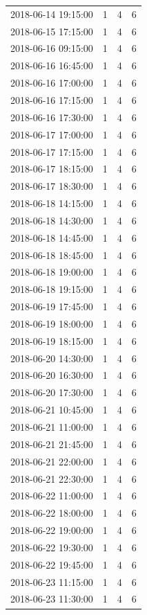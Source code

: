 \begin{tabular}{lrrr}
2018-06-14 19:15:00 & 1 & 4 & 6 \\
2018-06-15 17:15:00 & 1 & 4 & 6 \\
2018-06-16 09:15:00 & 1 & 4 & 6 \\
2018-06-16 16:45:00 & 1 & 4 & 6 \\
2018-06-16 17:00:00 & 1 & 4 & 6 \\
2018-06-16 17:15:00 & 1 & 4 & 6 \\
2018-06-16 17:30:00 & 1 & 4 & 6 \\
2018-06-17 17:00:00 & 1 & 4 & 6 \\
2018-06-17 17:15:00 & 1 & 4 & 6 \\
2018-06-17 18:15:00 & 1 & 4 & 6 \\
2018-06-17 18:30:00 & 1 & 4 & 6 \\
2018-06-18 14:15:00 & 1 & 4 & 6 \\
2018-06-18 14:30:00 & 1 & 4 & 6 \\
2018-06-18 14:45:00 & 1 & 4 & 6 \\
2018-06-18 18:45:00 & 1 & 4 & 6 \\
2018-06-18 19:00:00 & 1 & 4 & 6 \\
2018-06-18 19:15:00 & 1 & 4 & 6 \\
2018-06-19 17:45:00 & 1 & 4 & 6 \\
2018-06-19 18:00:00 & 1 & 4 & 6 \\
2018-06-19 18:15:00 & 1 & 4 & 6 \\
2018-06-20 14:30:00 & 1 & 4 & 6 \\
2018-06-20 16:30:00 & 1 & 4 & 6 \\
2018-06-20 17:30:00 & 1 & 4 & 6 \\
2018-06-21 10:45:00 & 1 & 4 & 6 \\
2018-06-21 11:00:00 & 1 & 4 & 6 \\
2018-06-21 21:45:00 & 1 & 4 & 6 \\
2018-06-21 22:00:00 & 1 & 4 & 6 \\
2018-06-21 22:30:00 & 1 & 4 & 6 \\
2018-06-22 11:00:00 & 1 & 4 & 6 \\
2018-06-22 18:00:00 & 1 & 4 & 6 \\
2018-06-22 19:00:00 & 1 & 4 & 6 \\
2018-06-22 19:30:00 & 1 & 4 & 6 \\
2018-06-22 19:45:00 & 1 & 4 & 6 \\
2018-06-23 11:15:00 & 1 & 4 & 6 \\
2018-06-23 11:30:00 & 1 & 4 & 6 \\

\end{tabular}
